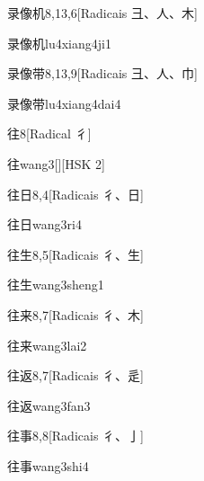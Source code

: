\begin{entry}{录像机}{8,13,6}[Radicais ⼹、⼈、⽊]
  \begin{phonetics}{录像机}{lu4xiang4ji1}
  \end{phonetics}
\end{entry}

\begin{entry}{录像带}{8,13,9}[Radicais ⼹、⼈、⼱]
  \begin{phonetics}{录像带}{lu4xiang4dai4}
  \end{phonetics}
\end{entry}

\begin{entry}{往}{8}[Radical ⼻]
  \begin{phonetics}{往}{wang3}[][HSK 2]
  \end{phonetics}
\end{entry}

\begin{entry}{往日}{8,4}[Radicais ⼻、⽇]
  \begin{phonetics}{往日}{wang3ri4}
  \end{phonetics}
\end{entry}

\begin{entry}{往生}{8,5}[Radicais ⼻、⽣]
  \begin{phonetics}{往生}{wang3sheng1}
  \end{phonetics}
\end{entry}

\begin{entry}{往来}{8,7}[Radicais ⼻、⽊]
  \begin{phonetics}{往来}{wang3lai2}
  \end{phonetics}
\end{entry}

\begin{entry}{往返}{8,7}[Radicais ⼻、⾡]
  \begin{phonetics}{往返}{wang3fan3}
  \end{phonetics}
\end{entry}

\begin{entry}{往事}{8,8}[Radicais ⼻、⼅]
  \begin{phonetics}{往事}{wang3shi4}
  \end{phonetics}
\end{entry}

